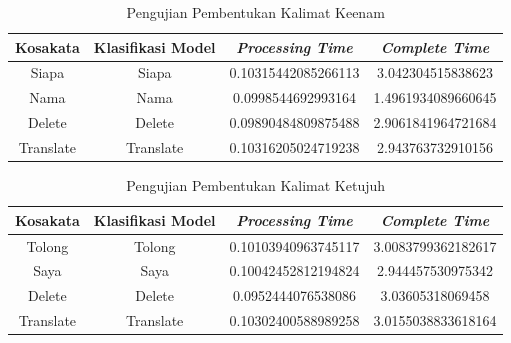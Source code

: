\begin{longtable}{|c|c|c|c|}
  \caption{Pengujian Pembentukan Kalimat Keenam}
  \label{tb:prediksikombinasi6}                                   \\
  \hline
  \rowcolor[HTML]{C0C0C0}
  \textbf{Kosakata} & \textbf{Klasifikasi Model} & \textbf{\emph{Processing Time}} & \textbf{\emph{Complete Time}}\\
  \hline
  Siapa              & Siapa                        & 0.10315442085266113                           & 3.042304515838623                                  \\
  Nama            & Nama                        & 0.0998544692993164                           & 1.4961934089660645                                  \\
  Delete              & Delete                        & 0.09890484809875488                           & 2.9061841964721684                                  \\
  Translate              & Translate                        & 0.10316205024719238                           & 2.943763732910156                                  \\
  \hline
\end{longtable}

\begin{longtable}{|c|c|c|c|}
  \caption{Pengujian Pembentukan Kalimat Ketujuh}
  \label{tb:prediksikombinasi7}                                   \\
  \hline
  \rowcolor[HTML]{C0C0C0}
  \textbf{Kosakata} & \textbf{Klasifikasi Model} & \textbf{\emph{Processing Time}} & \textbf{\emph{Complete Time}}\\
  \hline
  Tolong              & Tolong                        & 0.10103940963745117                           & 3.0083799362182617                                  \\
  Saya            & Saya                        & 0.10042452812194824                           & 2.944457530975342                                  \\
  Delete              & Delete                        & 0.0952444076538086                           & 3.03605318069458                                  \\
  Translate              & Translate                        & 0.10302400588989258                           & 3.0155038833618164                                  \\
  \hline
\end{longtable}


